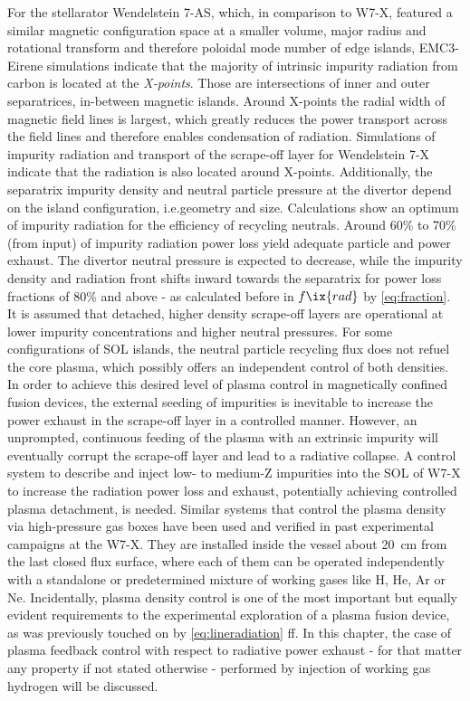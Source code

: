     For the stellarator Wendelstein 7-AS, which, in comparison to W7-X, featured a similar magnetic configuration space at a smaller volume, major radius and rotational transform and therefore poloidal mode number of edge islands, EMC3-Eirene simulations indicate that the majority of intrinsic impurity radiation from carbon is located at the \textit{X-points}. Those are intersections of inner and outer separatrices, in-between magnetic islands\cite{Harbour1989}. Around X-points the radial width of magnetic field lines is largest, which greatly reduces the power transport across the field lines and therefore enables condensation of radiation\cite{Feng2005,Thomsen2004}. Simulations of impurity radiation and transport of the scrape-off layer for Wendelstein 7-X indicate that the radiation is also located around X-points. Additionally, the separatrix impurity density and neutral particle pressure at the divertor depend on the island configuration, i.e.geometry and size. Calculations show an optimum of impurity radiation for the efficiency of recycling neutrals. Around 60\% to 70\% (from input) of impurity radiation power loss yield adequate particle and power exhaust. The divertor neutral pressure is expected to decrease, while the impurity density and radiation front shifts inward towards the separatrix for power loss fractions of 80\% and above - as calculated before in $f\ix{rad}$ by \cref{eq:fraction}. It is assumed that detached, higher density scrape-off layers are operational at lower impurity concentrations and higher neutral pressures. For some configurations of SOL islands, the neutral particle recycling flux does not refuel the core plasma, which possibly offers an independent control of both densities\cite{Feng2016}.\\%
    In order to achieve this desired level of plasma control in magnetically confined fusion devices, the external seeding of impurities is inevitable to increase the power exhaust in the scrape-off layer in a controlled manner\cite{Schmitz2020,Pacher2007,Kallenbach2013,Feng2016}. However, an unprompted, continuous feeding of the plasma with an extrinsic impurity will eventually corrupt the scrape-off layer and lead to a radiative collapse. A control system to describe and inject low- to medium-Z impurities into the SOL of W7-X to increase the radiation power loss and exhaust, potentially achieving controlled plasma detachment, is needed. Similar systems that control the plasma density via high-pressure gas boxes have been used and verified in past experimental campaigns at the W7-X. They are installed inside the vessel about \SI{20}{\centi\meter} from the last closed flux surface, where each of them can be operated independently with a standalone or predetermined mixture of working gases like H, He, Ar or Ne. Incidentally, plasma density control is one of the most important but equally evident requirements to the experimental exploration of a plasma fusion device\cite{Hirsch2013,Pedersen2015,Bosch2018}, as was previously touched on by \cref{eq:lineradiation} ff. In this chapter, the case of plasma feedback control with respect to radiative power exhaust - for that matter any property if not stated otherwise - performed by injection of working gas hydrogen will be discussed.\\%
